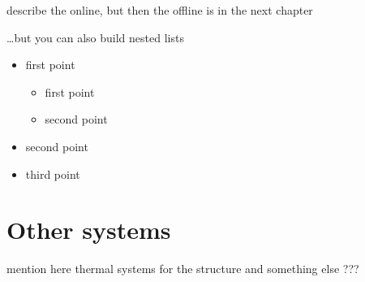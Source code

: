 describe the online, but then the offline is in the next chapter

\noindent
\dots but you can also build nested lists
\begin{itemize}
\item first point
	\begin{itemize} %
	\item first point
	\item second point
	\end{itemize}
\item second point
\item third point \\
\end{itemize}




\section[Other systems]{Other systems}

mention here thermal systems for the structure and something else ???


